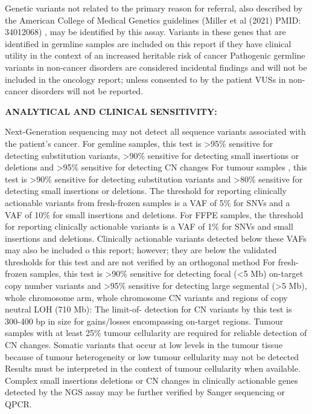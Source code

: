 \documentclass[8pt,letterpaper]{extarticle}
\begin{document}
{Genetic variants not related to the primary reason for referral, also described by the American College of Medical Genetics guidelines (Miller et al (2021) PMID: 34012068) , may be identified by this assay. Variants in these genes that are identified in germline samples are included on this report if they have clinical utility in the context of an increased heritable risk of cancer Pathogenic germline variants in non-cancer disorders are considered incidental findings and will not be included in the oncology report; unless consented to by the patient VUSs in non-cancer disorders will not be reported.

{\bf ANALYTICAL AND CLINICAL SENSITIVITY:}

Next-Generation sequencing may not detect all sequence variants associated with the patient's cancer. For gemline samples, this test is >95\% sensitive for detecting substitution variants, >90\% sensitive for detecting small insertions or deletions and >95\% sensitive for detecting CN changes For tumour samples , this test is >90\% sensitive for detecting substitution variants and >80\% sensitive for detecting small insertions or deletions. The threshold for reporting clinically actionable variants from fresh-frozen samples is a VAF of 5\% for SNVs and a VAF of 10\% for small insertions and deletions. For FFPE samples, the threshold for reporting clinically actionable variants is a VAF of 1\% for SNVs and small insertions and deletions. Clinically actionable variants detected below these VAFs may also be included o this report; however; they are below the validated thresholds for this test and are not verified by an orthogonal method For fresh-frozen samples, this test is >90\% sensitive for detecting focal (<5 Mb) on-target copy number variants and >95\% sensitive for detecting large segmental (>5 Mb), whole chromosome arm, whole chromosome CN variants and regions of copy neutral LOH (710 Mb): The limit-of- detection for CN variants by this test is 300-400 bp in size for gains/losses encompassing on-target regions. Tumour samples with at least 25\% tumour cellularity are required for reliable detection of CN changes.  Somatic variants that occur at low levels in the tumour tissue because of tumour heterogeneity or low tumour cellularity may not be detected Results must be interpreted in the context of tumour cellularity when available. Complex small insertions deletions or CN changes in clinically actionable genes detected by the NGS assay may be further verified by Sanger sequencing or QPCR.

}
\end{document}
